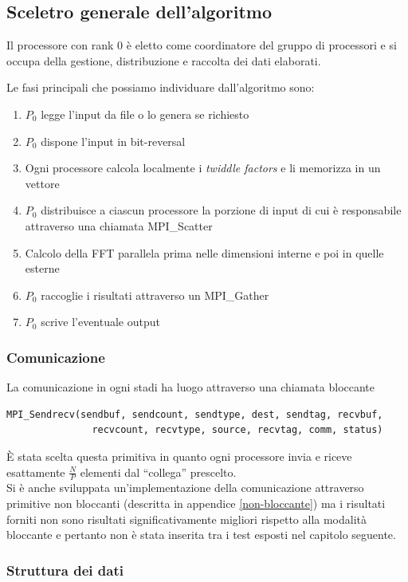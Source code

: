 \documentclass[12pt,a4paper,oneside,openright]{article}
\begin{document}
\subsection{Sceletro generale dell'algoritmo}

Il processore con rank 0 è eletto come coordinatore del gruppo di processori e si occupa della gestione, distribuzione e raccolta dei dati elaborati.

Le fasi principali che possiamo individuare dall'algoritmo sono:
\begin{enumerate}
\item $P_{0}$ legge l'input da file o lo genera se richiesto
\item $P_{0}$ dispone l'input in bit-reversal
\item Ogni processore calcola localmente i \emph{twiddle factors} e li memorizza in un vettore
\item $P_{0}$ distribuisce a ciascun processore la porzione di input di cui è responsabile attraverso una chiamata MPI\_Scatter
\item Calcolo della FFT parallela prima nelle dimensioni interne e poi in quelle esterne
\item $P_{0}$ raccoglie i risultati attraverso un MPI\_Gather
\item $P_{0}$ scrive l'eventuale output
\end{enumerate}
 
\subsubsection{Comunicazione}
La comunicazione in ogni stadi ha luogo attraverso una chiamata bloccante
\begin{verbatim}
MPI_Sendrecv(sendbuf, sendcount, sendtype, dest, sendtag, recvbuf, 
               recvcount, recvtype, source, recvtag, comm, status)
\end{verbatim} 
È stata scelta questa primitiva in quanto ogni processore invia e riceve esattamente $\frac{N}{P}$ elementi dal ``collega'' prescelto.\\
Si è anche sviluppata un'implementazione della comunicazione attraverso primitive non bloccanti (descritta in appendice \ref{non-bloccante}) ma i risultati forniti non sono risultati significativamente migliori rispetto alla modalità bloccante e pertanto non è stata inserita tra i test esposti nel capitolo seguente.

\subsubsection{Struttura dei dati}
\end{document}
